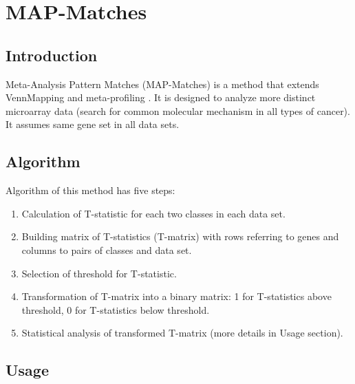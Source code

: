 \documentclass[a4paper]{report}
\begin{document}

\chapter{MAP-Matches}
\section*{Introduction}
Meta-Analysis Pattern Matches (MAP-Matches) \cite{Yang2005} is a method that extends VennMapping \cite{Smid} and meta-profiling \cite{velkyRhodes}. It is designed to analyze more distinct microarray data (search for common molecular mechanism in all types of cancer). It assumes same gene set in all data sets. 
\section*{Algorithm}
Algorithm of this method has five steps:
\begin{enumerate}
\item Calculation of T-statistic for each two classes in each data set. 
\item Building matrix of T-statistics (T-matrix) with rows referring to genes and columns to pairs of classes and data set.
\item Selection of threshold for T-statistic.
\item Transformation of T-matrix into a binary matrix: 1 for T-statistics above threshold, 0 for T-statistics below threshold.
\item Statistical analysis of transformed T-matrix (more details in Usage section).  
\end{enumerate}

\section*{Usage}
\end{document}
